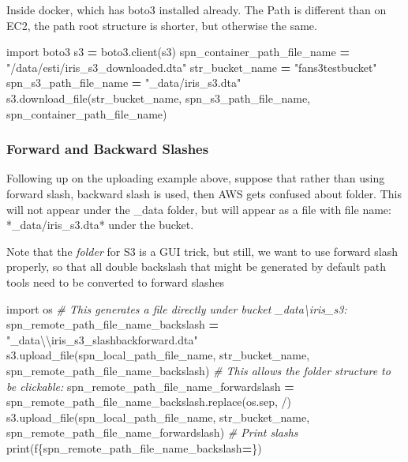 \documentclass[
]{book}
\newenvironment{Shaded}{\begin{snugshade}}{\end{snugshade}}
\newcommand{\BuiltInTok}[1]{#1}
\newcommand{\CharTok}[1]{\textcolor[rgb]{0.31,0.60,0.02}{#1}}
\newcommand{\CommentTok}[1]{\textcolor[rgb]{0.56,0.35,0.01}{\textit{#1}}}
\newcommand{\ImportTok}[1]{#1}
\newcommand{\NormalTok}[1]{#1}
\newcommand{\OperatorTok}[1]{\textcolor[rgb]{0.81,0.36,0.00}{\textbf{#1}}}
\newcommand{\SpecialCharTok}[1]{\textcolor[rgb]{0.00,0.00,0.00}{#1}}
\newcommand{\SpecialStringTok}[1]{\textcolor[rgb]{0.31,0.60,0.02}{#1}}
\newcommand{\StringTok}[1]{\textcolor[rgb]{0.31,0.60,0.02}{#1}}
\begin{document}
Inside docker, which has boto3 installed already. The Path is different than on EC2, the path root structure is shorter, but otherwise the same.

\begin{Shaded}
\begin{Highlighting}[]
\ImportTok{import}\NormalTok{ boto3}
\NormalTok{s3 }\OperatorTok{=}\NormalTok{ boto3.client(}\StringTok{\textquotesingle{}s3\textquotesingle{}}\NormalTok{)}
\NormalTok{spn\_container\_path\_file\_name }\OperatorTok{=} \StringTok{"/data/esti/iris\_s3\_downloaded.dta"}
\NormalTok{str\_bucket\_name }\OperatorTok{=} \StringTok{"fans3testbucket"}
\NormalTok{spn\_s3\_path\_file\_name }\OperatorTok{=} \StringTok{"\_data/iris\_s3.dta"}
\NormalTok{s3.download\_file(str\_bucket\_name, spn\_s3\_path\_file\_name, spn\_container\_path\_file\_name)}
\end{Highlighting}
\end{Shaded}

\hypertarget{forward-and-backward-slashes}{%
\subsubsection{Forward and Backward Slashes}\label{forward-and-backward-slashes}}

Following up on the uploading example above, suppose that rather than using forward slash, backward slash is used, then AWS gets confused about folder. This will not appear under the \_data folder, but will appear as a file with file name: *\_data/iris\_s3.dta* under the bucket.

Note that the \emph{folder} for S3 is a GUI trick, but still, we want to use forward slash properly, so that all double backslash that might be generated by default path tools need to be converted to forward slashes

\begin{Shaded}
\begin{Highlighting}[]
\ImportTok{import}\NormalTok{ os}
\CommentTok{\# This generates a file directly under bucket \_data\textbackslash{}iris\_s3:}
\NormalTok{spn\_remote\_path\_file\_name\_backslash }\OperatorTok{=} \StringTok{"\_data}\CharTok{\textbackslash{}\textbackslash{}}\StringTok{iris\_s3\_slashbackforward.dta"}
\NormalTok{s3.upload\_file(spn\_local\_path\_file\_name, str\_bucket\_name, spn\_remote\_path\_file\_name\_backslash)}
\CommentTok{\# This allows the folder structure to be clickable:}
\NormalTok{spn\_remote\_path\_file\_name\_forwardslash }\OperatorTok{=}\NormalTok{ spn\_remote\_path\_file\_name\_backslash.replace(os.sep, }\StringTok{\textquotesingle{}/\textquotesingle{}}\NormalTok{)}
\NormalTok{s3.upload\_file(spn\_local\_path\_file\_name, str\_bucket\_name, spn\_remote\_path\_file\_name\_forwardslash)}
\CommentTok{\# Print slashs}
\BuiltInTok{print}\NormalTok{(}\SpecialStringTok{f\textquotesingle{}}\SpecialCharTok{\{}\NormalTok{spn\_remote\_path\_file\_name\_backslash}\OperatorTok{=}\SpecialCharTok{\}}\SpecialStringTok{\textquotesingle{}}\NormalTok{)}
\end{Highlighting}
\end{Shaded}
\end{document}
